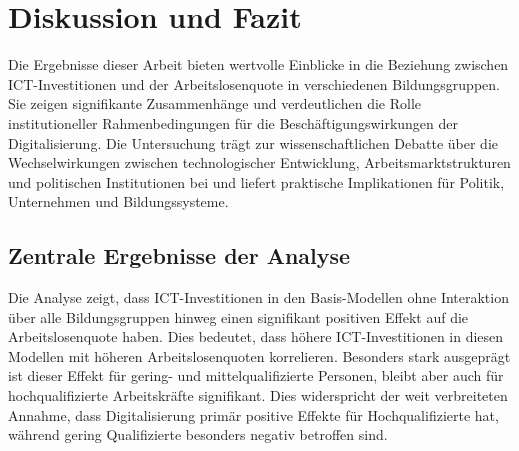 
\section{Diskussion und Fazit}

Die Ergebnisse dieser Arbeit bieten wertvolle Einblicke in die Beziehung zwischen 
\ac{ICT}-Investitionen und der Arbeitslosenquote in verschiedenen Bildungsgruppen. Sie 
zeigen signifikante Zusammenhänge und verdeutlichen die Rolle institutioneller 
Rahmenbedingungen für die Beschäftigungswirkungen der Digitalisierung. Die Untersuchung 
trägt zur wissenschaftlichen Debatte über die Wechselwirkungen zwischen technologischer 
Entwicklung, Arbeitsmarktstrukturen und politischen Institutionen bei und liefert 
praktische Implikationen für Politik, Unternehmen und Bildungssysteme.

\subsection{Zentrale Ergebnisse der Analyse}

Die Analyse zeigt, dass \ac{ICT}-Investitionen in den Basis-Modellen ohne Interaktion 
über alle Bildungsgruppen hinweg einen signifikant positiven Effekt auf die Arbeitslosenquote 
haben. Dies bedeutet, dass höhere \ac{ICT}-Investitionen in diesen Modellen mit höheren 
Arbeitslosenquoten korrelieren. Besonders stark ausgeprägt ist dieser Effekt für 
gering- und mittelqualifizierte Personen, bleibt aber auch für hochqualifizierte 
Arbeitskräfte signifikant. Dies widerspricht der weit verbreiteten Annahme, dass 
Digitalisierung primär positive Effekte für Hochqualifizierte hat, während gering 
Qualifizierte besonders negativ betroffen sind. 

